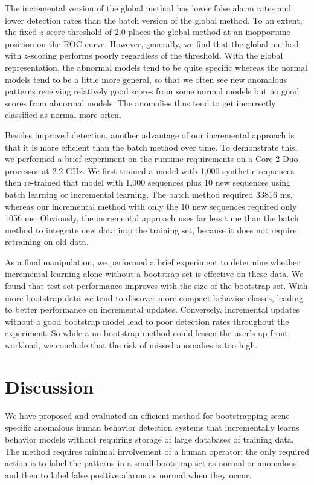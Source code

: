The incremental version of the global method has lower false alarm
rates and lower detection rates than the batch version of the global
method. To an extent, the fixed $z$-score threshold of 2.0 places the
global method at an inopportune position on the ROC curve. However,
generally, we find that the global method with $z$-scoring performs
poorly regardless of the threshold. With the global representation,
the abnormal models tend to be quite specific whereas the normal
models tend to be a little more general, so that we often see new
anomalous patterns receiving relatively good scores from some normal
models but no good scores from abnormal models. The anomalies thus
tend to get incorrectly classified as normal more often.

Besides improved detection, another advantage of our incremental
approach is that it is more efficient than the batch method over time.
To demonstrate this, we performed a brief experiment on the runtime
requirements on a Core 2 Duo processor at 2.2 GHz. We first trained a
model with 1,000 synthetic sequences then re-trained that model with
1,000 sequences plus 10 new sequences using batch learning or
incremental learning. The batch method required 33816 ms, whereas our
incremental method with only the 10 new sequences required only 1056
ms. Obviously, the incremental approach uses far less time than the
batch method to integrate new data into the training set, because it
does not require retraining on old data.

As a final manipulation, we performed a brief experiment to determine
whether incremental learning alone without a bootstrap set is
effective on these data.  We found that test set performance improves
with the size of the bootstrap set.  With more bootstrap data we tend
to discover more compact behavior classes, leading to better
performance on incremental updates. Conversely, incremental updates
without a good bootstrap model lead to poor detection rates throughout
the experiment. So while a no-bootstrap method could lessen the user's
up-front workload, we conclude that the risk of missed anomalies is
too high.

\section{Discussion}
\label{incremental-conclusion}

We have proposed and evaluated an efficient method for bootstrapping
scene-specific anomalous human behavior detection systems that
incrementally learns behavior models without requiring storage of
large databases of training data. The method requires minimal
involvement of a human operator; the only required action is to label
the patterns in a small bootstrap set as normal or anomalous and then
to label false positive alarms as normal when they occur.

